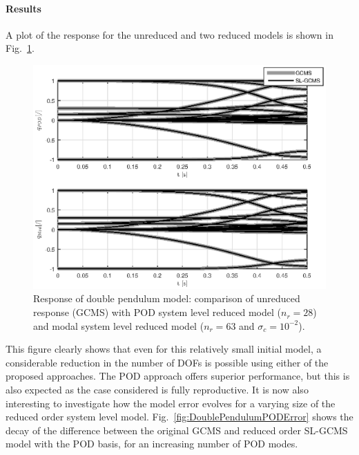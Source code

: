 \paragraph{Results}
A plot of the response for the unreduced and two reduced models is shown in Fig.~\ref{fig:DoublePendulumResponse}.
\begin{figure}[htp]
\centering
\includegraphics[scale=1]{DoublePendulumResponse.eps} 
\caption{Response of double pendulum model: comparison of unreduced response (GCMS) with POD system level reduced model ($n_r=28$) and modal system level reduced model ($n_r=63$ and $\sigma_c=10^{-2}$).}
\label{fig:DoublePendulumResponse}
\end{figure}
This figure clearly shows that even for this relatively small initial model, a considerable reduction in the number of DOFs is possible using either of the proposed approaches. The POD approach offers superior performance, but this is also expected as the case considered is fully reproductive.
It is now also interesting to investigate how the model error evolves for a varying size of the reduced order system level model. 
Fig.~\ref{fig:DoublePendulumPODError} shows the decay of the difference between the original GCMS and reduced order SL-GCMS model with the POD basis, for an increasing number of POD modes. 
